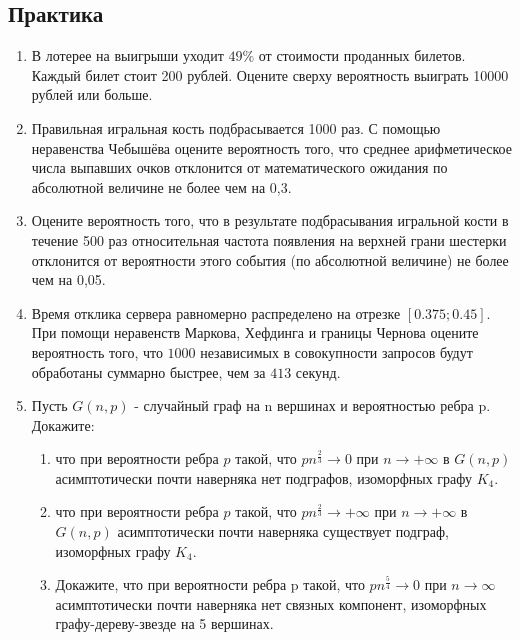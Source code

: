 \documentclass[a4paper, 14pt]{extarticle}
\begin{document}
\subsection*{Практика}
\begin{enumerate}
\item В лотерее на выигрыши уходит $49\%$ от стоимости проданных билетов. Каждый билет стоит 200 рублей. Оцените сверху вероятность выиграть 10000 рублей или больше.
\item Правильная игральная кость подбрасывается 1000 раз. С помощью неравенства Чебышёва оцените вероятность того, что среднее арифметическое числа выпавших очков отклонится от математического ожидания по абсолютной величине не более чем на 0,3. 
\item Оцените вероятность того, что в результате подбрасывания игральной кости в течение 500 раз относительная частота появления на верхней грани шестерки отклонится от вероятности этого события (по абсолютной величине) не более чем на 0,05. 


\item Время отклика сервера равномерно распределено на отрезке $\left[0.375; 0.45\right]$. При помощи неравенств Маркова, Хефдинга и границы Чернова оцените вероятность того, что $1000$ независимых в совокупности запросов будут обработаны суммарно быстрее, чем за $413$ секунд.

\item Пусть $G(n,p)$ - случайный граф на n вершинах и вероятностью ребра p. Докажите: 
\begin{enumerate}
    \item что при вероятности ребра $p$ такой, что $pn^{\frac{2}{3}}\to 0$ при $n\to +\infty$ в $G(n,p)$ асимптотически почти наверняка нет подграфов, изоморфных графу $K_4$.
    \item что при вероятности ребра $p$ такой, что $pn^{\frac{2}{3}}\to +\infty$ при $n\to +\infty$ в $G(n,p)$ асимптотически почти наверняка существует подграф, изоморфных графу $K_4$.
    \item Докажите, что при вероятности ребра p такой, что $pn^{\frac{5}{4}} \to 0$ при $n \to \infty$ асимптотически почти наверняка нет связных компонент, изоморфных графу-дереву-звезде на 5 вершинах. 
\end{enumerate}

\end{enumerate}
\newpage
\end{document}
